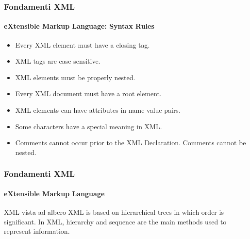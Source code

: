 \begin{frame}
	\frametitle{Fondamenti XML}
	\framesubtitle{eXtensible Markup Language: Syntax Rules}
	\addtocounter{nframe}{1}

	\begin{itemize}

		\item Every XML element must have a closing tag.

		\item XML tags are case sensitive.

		\item XML elements must be ­properly nested.

		\item Every XML document must have a root element.

		\item XML elements can have attributes in name-value pairs.

		\item Some characters have a ­special meaning in XML.

		\item Comments cannot occur prior to the XML Declaration. Comments cannot be nested.

	\end{itemize}

\end{frame}


\begin{frame}
	\frametitle{Fondamenti XML}
	\framesubtitle{eXtensible Markup Language}
	\addtocounter{nframe}{1}

	\begin{block}{XML vista ad albero}
		XML is based on hierarchical trees in which order is significant.
		In XML, hierarchy and sequence are the main methods used to represent information.
	\end{block}

\end{frame}

